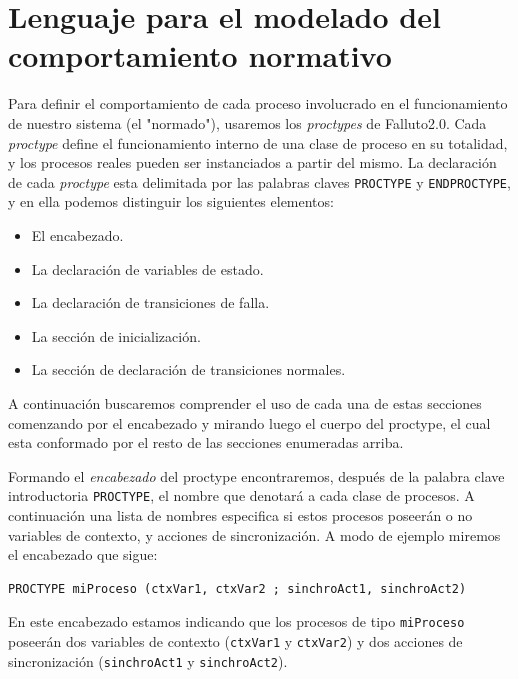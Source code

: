 \documentclass[pdftex,a4paper,12pt]{book}
\begin{document}
\section{Lenguaje para el modelado del comportamiento normativo}
Para definir el comportamiento de cada proceso involucrado en el funcionamiento de nuestro sistema (el "normado"), usaremos los \textit{proctypes} de Falluto2.0. Cada \textit{proctype} define el funcionamiento interno de una clase de proceso en su totalidad, y los procesos reales pueden ser instanciados a partir del mismo. La declaraci\'on de cada \textit{proctype} esta delimitada por las palabras claves \texttt{PROCTYPE} y \texttt{ENDPROCTYPE}, y en ella podemos distinguir los siguientes elementos:
\begin{itemize}
\item El encabezado.
\item La declaraci\'on de variables de estado.
\item La declaraci\'on de transiciones de falla.
\item La secci\'on de inicializaci\'on.
\item La secci\'on de declaraci\'on de transiciones normales.
\end{itemize} 

A continuaci\'on buscaremos comprender el uso de cada una de estas secciones comenzando por el encabezado y mirando luego el cuerpo del proctype, el cual esta conformado por el resto de las secciones enumeradas arriba.

Formando el \textit{encabezado} del proctype encontraremos, despu\'es de la palabra clave introductoria \texttt{PROCTYPE}, el nombre que denotar\'a a cada clase de procesos. A continuaci\'on una lista de nombres especifica si estos procesos poseer\'an o no variables de contexto, y acciones de sincronizaci\'on. A modo de ejemplo miremos el encabezado que sigue:

\begin{verbatim}
PROCTYPE miProceso (ctxVar1, ctxVar2 ; sinchroAct1, sinchroAct2)
\end{verbatim}

En este encabezado estamos indicando que los procesos de tipo \texttt{miProceso} poseer\'an dos variables de contexto (\texttt{ctxVar1} y \texttt{ctxVar2}) y dos acciones de sincronizaci\'on (\texttt{sinchroAct1} y \texttt{sinchroAct2}).
\end{document}
